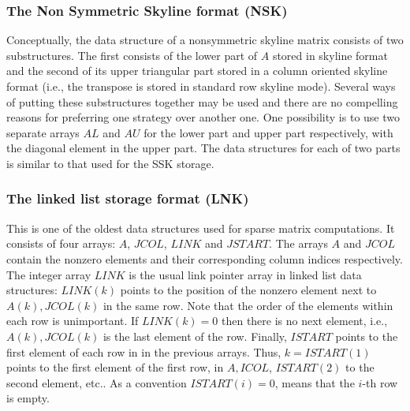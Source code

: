 \documentclass[12pt]{article}
\begin{document}
\subsubsection{The Non Symmetric Skyline format (NSK) }
Conceptually, the  data structure of a nonsymmetric skyline 
matrix consists of two substructures. 
The first consists of the lower part of $A$ stored in skyline format
and the second of its upper triangular part stored in a column
oriented skyline format (i.e., the transpose is stored in
standard row skyline mode). Several ways of putting these
substructures together may be used and there are no compelling 
reasons for preferring one strategy over another one. 
One possibility is to use two separate arrays $AL$ and $AU$ for
the lower part and upper part respectively, with the diagonal 
element in the upper part. The data structures for each of 
two parts is similar to that used for the SSK storage.


\subsubsection{The linked list storage format (LNK) }  
This is one of the oldest data structures used for sparse matrix computations.
It consists of four arrays: $A$, $JCOL$, $LINK$ and $JSTART$. 
The arrays $A$ and $JCOL$ contain the nonzero elements and their
corresponding column indices respectively. The integer array $LINK$ is
the usual link pointer array in linked list data structures: 
$LINK(k)$ points to the position of the nonzero element next to 
$A(k), JCOL(k)$ in the same row. Note that the order of the elements 
within each row is unimportant.  If $LINK(k) =0$ then there is no
next element, i.e., $A(k), JCOL(k)$ is the last element of the row.
Finally, $ISTART$ points to the first element of each row in 
in the previous arrays. Thus, $k=ISTART(1)$ points to the first element
of the first row, in $A, ICOL$, 
 $ISTART(2) $ to the second element, etc..
As a convention $ISTART(i) = 0$, means that the $i$-th row is empty.
\end{document}
